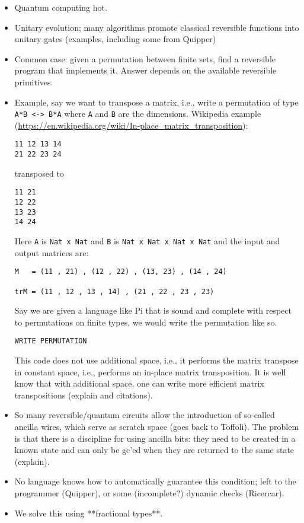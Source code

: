 \documentclass[sigplan,10pt,review,anonymous]{acmart}
\begin{document}
\begin{itemize}

\item Quantum computing hot.

\item Unitary evolution; many algorithms promote classical reversible
functions into unitary gates (examples, including some from Quipper)

\item Common case: given a permutation between finite sets, find a
  reversible program that implements it. Answer depends on the
  available reversible primitives.

\item Example, say we want to transpose a matrix, i.e., write a
  permutation of type \verb|A*B <-> B*A| where \verb|A| and \verb|B|
  are the dimensions. Wikipedia example
  (\url{https://en.wikipedia.org/wiki/In-place_matrix_transposition}):
\begin{verbatim}
11 12 13 14 
21 22 23 24 
\end{verbatim}
  transposed to
\begin{verbatim}
11 21
12 22
13 23
14 24
\end{verbatim}
  Here \verb|A| is \verb|Nat x Nat| and \verb|B| is
  \verb|Nat x Nat x Nat x Nat| and the input and output matrices are:
\begin{verbatim}
M   = (11 , 21) , (12 , 22) , (13, 23) , (14 , 24) 

trM = (11 , 12 , 13 , 14) , (21 , 22 , 23 , 23) 
\end{verbatim}
Say we are given a language like Pi that is sound and complete with
respect to permutations on finite types, we would write the
permutation like so.
\begin{verbatim}
WRITE PERMUTATION
\end{verbatim}
This code does not use additional space, i.e., it performs the matrix
transpose in constant space, i.e., performs an in-place matrix
transposition. It is well know that with additional space, one can
write more efficient matrix transpositions (explain and citations).

\item So many reversible/quantum circuits allow the introduction of
  so-called ancilla wires, which serve as scratch space (goes back to
  Toffoli). The problem is that there is a discipline for using
  ancilla bits: they need to be created in a known state and can only
  be gc'ed when they are returned to the same state (explain).

\item No language knows how to automatically guarantee this condition;
  left to the programmer (Quipper), or some (incomplete?) dynamic
  checks (Ricercar).

\item We solve this using **fractional types**.   

\end{itemize}
\end{document}
